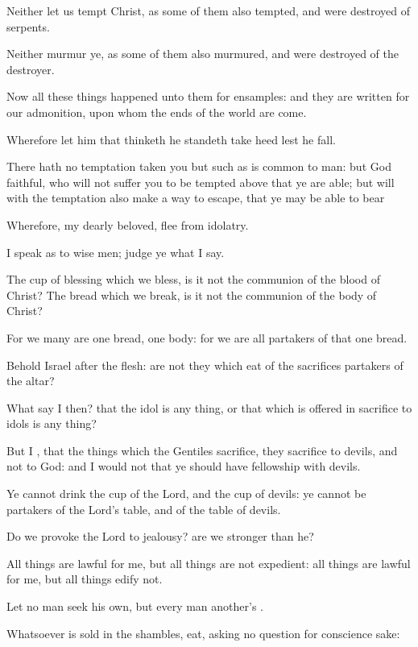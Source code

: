 {Neither let us
tempt
Christ,
as
some
of
them
also
tempted,
and were
destroyed of
serpents.

Neither murmur
ye,
as
some of
them
also
murmured,
and were
destroyed
of the
destroyer.

Now
all these
things
happened unto
them for
ensamples:
and they are
written
for
our
admonition,
upon
whom the
ends of the
world are
come.

Wherefore let him that
thinketh he
standeth take
heed
lest he
fall.

There
hath
no
temptation
taken
you but
such as
is common to
man:
but
God
{}
faithful,
who
will
not
suffer
you to be
tempted
above
that ye are
able;
but
will
with the
temptation
also
make a way to
escape, that
ye may be
able to
bear
{}


\par }{\PP {}Wherefore,
my dearly
beloved,
flee
from
idolatry.

I
speak
as to wise
men;
judge
ye
what I
say.

The
cup of
blessing
which we
bless, is
it
not the
communion of the
blood of
Christ? The
bread
which we
break, is
it
not the
communion of the
body of
Christ?

For
we
{}
many
are
one
bread,
{}
one
body:
for we
are
all
partakers
of that
one
bread.

Behold
Israel
after the
flesh:
are
not
they which
eat of the
sacrifices
partakers of the
altar?

What say
I
then?
that the
idol
is any
thing,
or that which is offered in sacrifice to
idols
is any
thing?

But I
{},
that the
things
which the
Gentiles
sacrifice, they
sacrifice to
devils,
and
not to
God:
and I
would
not
that
ye should
have
fellowship with
devils.

Ye
cannot
drink the
cup of the
Lord,
and the
cup of
devils:
ye
cannot be
partakers of the
Lord’s
table,
and of the
table of
devils.

Do we
provoke the
Lord to
jealousy? are
we
stronger than
he?

All
things are
lawful for
me,
but all
things
are
not
expedient: all
things are
lawful for
me,
but all
things
edify
not.

Let no
man
seek his
own,
but every
man
another’s
{}.

Whatsoever is
sold
in the
shambles,
{}
eat,
asking
no
question
for conscience
sake:

}
